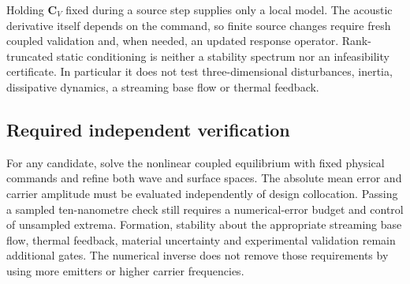 Holding $\bm C_V$ fixed during a source step supplies only a local model.
The acoustic derivative itself depends on the command, so finite source
changes require fresh coupled validation and, when needed, an updated
response operator. Rank-truncated static conditioning is neither a stability
spectrum nor an infeasibility certificate. In particular it does not test
three-dimensional disturbances, inertia, dissipative dynamics, a streaming
base flow or thermal feedback.

\subsection{Required independent verification}
For any candidate, solve the nonlinear coupled equilibrium with fixed physical
commands and refine both wave and surface spaces. The absolute mean error and
carrier amplitude must be evaluated independently of design collocation.
Passing a sampled ten-nanometre check still requires a numerical-error budget
and control of unsampled extrema. Formation, stability about the appropriate
streaming base flow, thermal feedback, material uncertainty and experimental
validation remain additional gates. The numerical inverse does not remove
those requirements by using more emitters or higher carrier frequencies.
